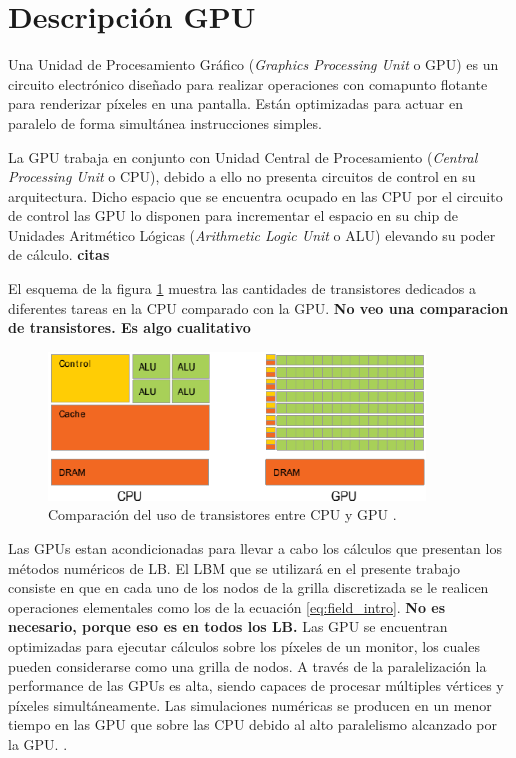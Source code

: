 \newpage
\section{Descripción GPU}

Una Unidad de Procesamiento Gráfico (\textit{Graphics Processing Unit} o GPU) es un  circuito electrónico diseñado para realizar operaciones con comapunto flotante para renderizar píxeles en una pantalla. Están optimizadas para actuar en paralelo de forma simultánea instrucciones simples.

La GPU trabaja en conjunto con Unidad Central de Procesamiento (\textit{Central Processing Unit} o CPU), debido a ello no presenta circuitos de control en su arquitectura. Dicho espacio que se encuentra ocupado en las CPU por el circuito de control las GPU lo disponen para incrementar el espacio en su chip de Unidades Aritmético Lógicas (\textit{Arithmetic Logic Unit} o ALU) elevando su poder de cálculo. \textbf{citas}

El esquema de la figura \ref{fig:cpu_gpu_transis} muestra las cantidades de transistores dedicados a diferentes tareas en la CPU comparado con la GPU.
\textbf{No veo una comparacion de transistores. Es algo cualitativo}

\begin{figure}[h!]
	\centering
	\includegraphics[width=10cm]{cpu_gpu.png}
	\caption{Comparación del uso de transistores entre CPU y GPU \cite{rinaldi2011modelos}.}
	\label{fig:cpu_gpu_transis}
\end{figure}

Las GPUs estan acondicionadas para llevar a cabo los cálculos que presentan los métodos numéricos de LB. El LBM que se utilizará en el presente trabajo consiste en que en cada uno de los nodos de la grilla discretizada se le realicen operaciones elementales como los de la ecuación \ref{eq:field_intro}. \textbf{No es necesario, porque eso es en todos los LB.} Las GPU se encuentran optimizadas para ejecutar cálculos sobre los píxeles de un monitor, los cuales pueden considerarse como una grilla de nodos. A través de la paralelización la performance de las GPUs es alta, siendo capaces de procesar múltiples vértices y píxeles simultáneamente. Las simulaciones numéricas se producen en un menor tiempo en las GPU que sobre las CPU debido al alto paralelismo alcanzado por la GPU. \cite{rinaldi2011modelos}.

